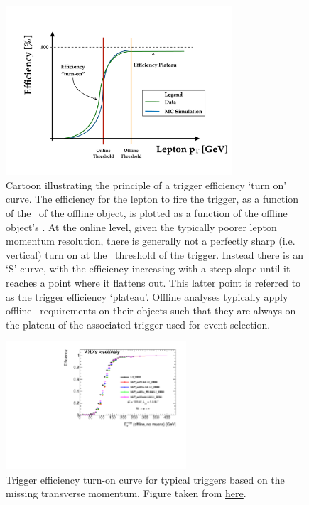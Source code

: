 \begin{figure}[!htb]
    \begin{center}
        \includegraphics[width=0.75\textwidth]{figures/common_ana/trig_plateauPDF}
        \caption{
            Cartoon illustrating the principle of a trigger efficiency `turn on' curve.
            The efficiency for the lepton to fire the trigger, as a function of the \pT~of the offline object, is plotted
            as a function of the offline object's \pT.
            At the online level, given the typically poorer lepton momentum resolution, there is generally
            not a perfectly sharp (i.e. vertical) turn on at the \pT~threshold of the trigger.
            Instead there is an `S'-curve, with the efficiency increasing with a steep slope
            until it reaches a point where it flattens out.
            This latter point is referred to as the trigger efficiency `plateau'.
            Offline analyses typically apply offline \pT~requirements on their objects
            such that they are always on the plateau of the associated trigger used for event selection.
        }
        \label{fig:trig_plateau_cartoon}
    \end{center}
\end{figure}

\begin{figure}[!htb]
    \begin{center}
        \includegraphics[width=0.6\textwidth]{figures/common_ana/trig/met_trig_example}
        \caption{
            Trigger efficiency turn-on curve for typical triggers based on the missing transverse momentum.
            Figure taken from \href{https://twiki.cern.ch/twiki/bin/view/AtlasPublic/MissingEtTriggerPublicResults}{here}.
        }
        \label{fig:met_trig_example}
    \end{center}
\end{figure}

